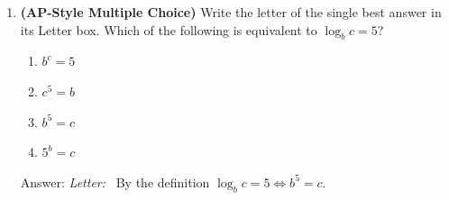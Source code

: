 \documentclass[10pt]{article}
\begin{document}
\begin{enumerate}[itemsep=14pt]
      \vspace{0.06in}
      $I / I_0 = $  \smash{\gradedblank[id=hw5a, type=short, points=1, answer={10^{7}}]{3cm}{13pt}} \qquad
      $\log_{10}(I / I_0) = $ \smash{\gradedblank[id=hw5b, type=short, points=1, answer={7}]{3cm}{13pt}} \qquad
      $L = $ \smash{\gradedblank[id=hw5c, type=short, points=1, display={70 dB}, answer={70}]{3cm}{13pt}}

\item \textbf{(AP-Style Multiple Choice)} Write the letter of the single best answer in its Letter box. Which of the following is equivalent to $\log_b c = 5$?

      \medskip
      \begin{enumerate}[label=(\Alph*), itemsep=4pt]
        \item $b^c = 5$
        \item $c^5 = b$
        \item $b^5 = c$
        \item $5^b = c$
      \end{enumerate}

      \vspace{0.04in}
      Answer: \textit{Letter:}~\gradedblank[id=hw6, type=choice, points=1, answer=C]{1.5cm}{13pt} \quad By the definition $\log_b c = 5 \Leftrightarrow b^5 = c$.

\end{enumerate}
\end{document}
